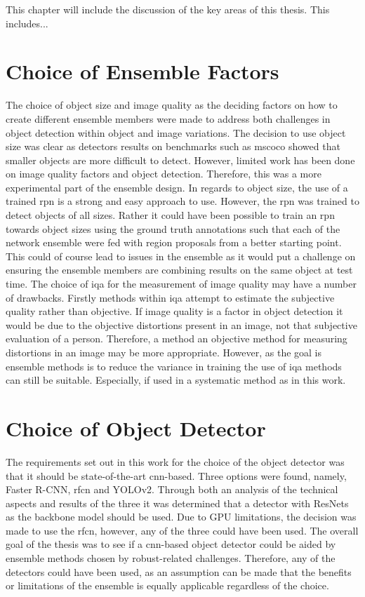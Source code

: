 This chapter will include the discussion of the key areas of this thesis. This includes...

\section{Choice of Ensemble Factors}
The choice of object size and image quality as the deciding factors on how to create different ensemble members were made to address both challenges in object detection within object and image variations. The decision to use object size was clear as detectors results on benchmarks such as \gls{mscoco} showed that smaller objects are more difficult to detect. However, limited work has been done on image quality factors and object detection. Therefore, this was a more experimental part of the ensemble design. In regards to object size, the use of a trained \gls{rpn} is a strong and easy approach to use. However, the \gls{rpn} was trained to detect objects of all sizes. Rather it could have been possible to train an \gls{rpn} towards object sizes using the ground truth annotations such that each of the network ensemble were fed with region proposals from a better starting point. This could of course lead to issues in the ensemble as it would put a challenge on ensuring the ensemble members are combining results on the same object at test time. The choice of \gls{iqa} for the measurement of image quality may have a number of drawbacks. Firstly methods within \gls{iqa} attempt to estimate the subjective quality rather than objective. If image quality is a factor in object detection it would be due to the objective distortions present in an image, not that subjective evaluation of a person. Therefore, a method an objective method for measuring distortions in an image may be more appropriate. However, as the goal is ensemble methods is to reduce the variance in training the use of \gls{iqa} methods can still be suitable. Especially, if used in a systematic method as in this work.


\section{Choice of Object Detector}
The requirements set out in this work for the choice of the object detector was that it should be state-of-the-art \gls{cnn}-based. Three options were found, namely, Faster R-CNN, \gls{rfcn} and YOLOv2. Through both an analysis of the technical aspects and results of the three it was determined that a detector with ResNets as the backbone model should be used. Due to GPU limitations, the decision was made to use the \gls{rfcn}, however, any of the three could have been used. The overall goal of the thesis was to see if a \gls{cnn}-based object detector could be aided by ensemble methods chosen by robust-related challenges. Therefore, any of the detectors could have been used, as an assumption can be made that the benefits or limitations of the ensemble is equally applicable regardless of the choice.

